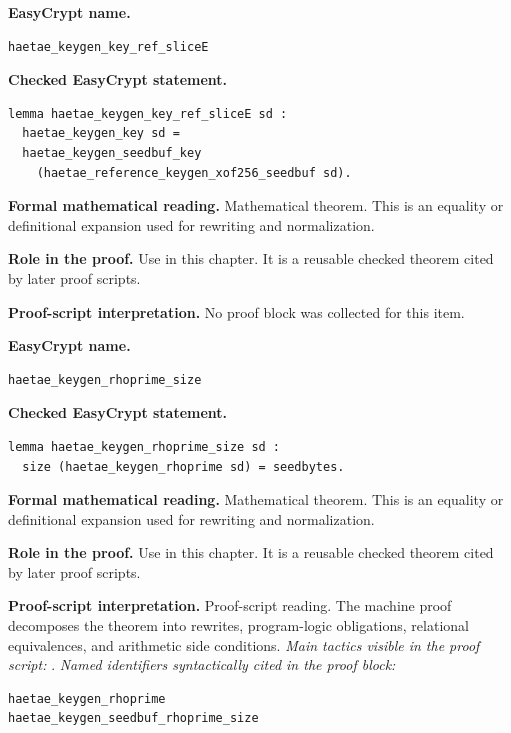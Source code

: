 \begin{formaltheorem}
\noindent\textbf{EasyCrypt name.}
\begin{lstlisting}[language=EasyCrypt,basicstyle=\ttfamily\scriptsize]
haetae_keygen_key_ref_sliceE
\end{lstlisting}
\noindent\textbf{Checked EasyCrypt statement.}
\begin{lstlisting}[language=EasyCrypt,basicstyle=\ttfamily\scriptsize]
lemma haetae_keygen_key_ref_sliceE sd :
  haetae_keygen_key sd =
  haetae_keygen_seedbuf_key
    (haetae_reference_keygen_xof256_seedbuf sd).
\end{lstlisting}
\noindent\textbf{Formal mathematical reading.}
Mathematical theorem. This is an equality or definitional expansion used for rewriting and normalization.

\noindent\textbf{Role in the proof.}
Use in this chapter. It is a reusable checked theorem cited by later proof scripts.

\noindent\textbf{Proof-script interpretation.}
No proof block was collected for this item.

\end{formaltheorem}

\begin{formaltheorem}
\noindent\textbf{EasyCrypt name.}
\begin{lstlisting}[language=EasyCrypt,basicstyle=\ttfamily\scriptsize]
haetae_keygen_rhoprime_size
\end{lstlisting}
\noindent\textbf{Checked EasyCrypt statement.}
\begin{lstlisting}[language=EasyCrypt,basicstyle=\ttfamily\scriptsize]
lemma haetae_keygen_rhoprime_size sd :
  size (haetae_keygen_rhoprime sd) = seedbytes.
\end{lstlisting}
\noindent\textbf{Formal mathematical reading.}
Mathematical theorem. This is an equality or definitional expansion used for rewriting and normalization.

\noindent\textbf{Role in the proof.}
Use in this chapter. It is a reusable checked theorem cited by later proof scripts.

\noindent\textbf{Proof-script interpretation.}
Proof-script reading. The machine proof decomposes the theorem into rewrites, program-logic obligations, relational equivalences, and arithmetic side conditions.
\emph{Main tactics visible in the proof script:} .
\emph{Named identifiers syntactically cited in the proof block:}
\begin{lstlisting}[language=EasyCrypt,basicstyle=\ttfamily\scriptsize]
haetae_keygen_rhoprime
haetae_keygen_seedbuf_rhoprime_size
\end{lstlisting}

\end{formaltheorem}

